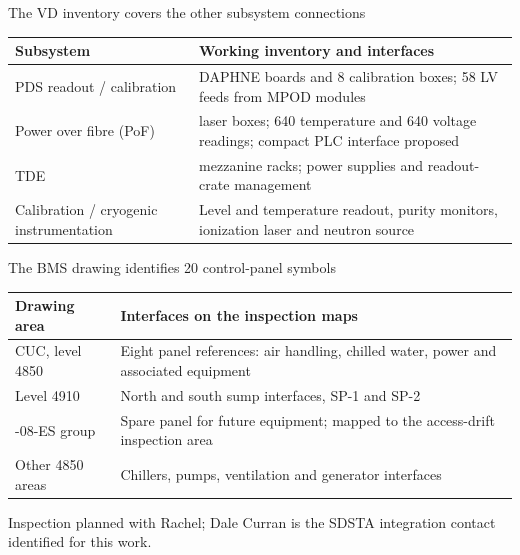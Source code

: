 \begin{frame}{The VD inventory covers the other subsystem connections}
  \renewcommand{\arraystretch}{1.35}
  \begin{tabularx}{\textwidth}{@{}>{\RaggedRight\arraybackslash}p{3.2cm}>{\RaggedRight\arraybackslash}X@{}}
    \toprule
    \textbf{Subsystem} & \textbf{Working inventory and interfaces}\\
    \midrule
    PDS readout / calibration & 42 DAPHNE boards and 8 calibration boxes; 58 LV feeds from MPOD modules\\
    Power over fibre (PoF) & 80 laser boxes; 640 temperature and 640 voltage readings; compact PLC interface proposed\\
    TDE & 20 mezzanine racks; power supplies and readout-crate management\\
    Calibration / cryogenic instrumentation & Level and temperature readout, purity monitors, ionization laser and neutron source\\
    \bottomrule
  \end{tabularx}
\end{frame}

\begin{frame}{The BMS drawing identifies 20 control-panel symbols}
  \renewcommand{\arraystretch}{1.4}
  \begin{tabularx}{\textwidth}{@{}>{\RaggedRight\arraybackslash}p{3.4cm}>{\RaggedRight\arraybackslash}X@{}}
    \toprule
    \textbf{Drawing area} & \textbf{Interfaces on the inspection maps}\\
    \midrule
    CUC, level 4850 & Eight panel references: air handling, chilled water, power and associated equipment\\
    Level 4910 & North and south sump interfaces, SP-1 and SP-2\\
    4850-08-ES group & Spare panel for future equipment; mapped to the access-drift inspection area\\
    Other 4850 areas & Chillers, pumps, ventilation and generator interfaces\\
    \bottomrule
  \end{tabularx}\par
  \medskip
  Inspection planned with Rachel; Dale Curran is the SDSTA integration contact identified for this work.
\end{frame}

